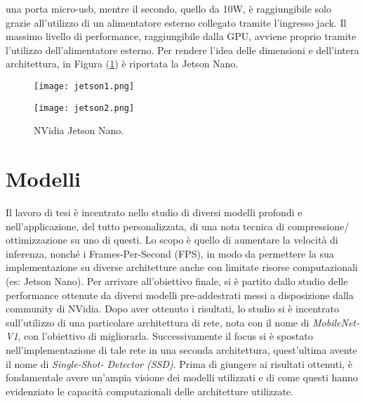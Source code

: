 una porta micro-usb, mentre il secondo, quello da 10W, è raggiungibile solo 
grazie all'utilizzo di un alimentatore esterno collegato tramite l'ingresso 
jack. Il massimo livello di performance, raggiungibile dalla GPU, avviene 
proprio tramite l'utilizzo dell'alimentatore esterno. Per rendere l'idea delle 
dimensioni e dell'intera architettura, in Figura (\ref{jetson}) è riportata la Jetson 
Nano.
\begin{figure}[]
    \begin{minipage}[t]{.45\textwidth}
        \centering
        \texttt{[image: jetson1.png]}
    \end{minipage}
    \hfill
    \begin{minipage}[t]{.45\textwidth}
        \centering
        \texttt{[image: jetson2.png]}
    \end{minipage}  
    \caption{NVidia Jetson Nano.}
    \label{jetson}
\end{figure}

\section{Modelli}
Il lavoro di tesi è incentrato nello studio di diversi modelli profondi e 
nell'applicazione, del tutto personalizzata, di una nota tecnica di compressione/
ottimizzazione su uno di questi. Lo scopo è quello di aumentare 
la velocità di inferenza, nonché i Frames-Per-Second (FPS), in modo da 
permettere la sua implementazione su diverse architetture anche con limitate 
risorse computazionali (es: Jetson Nano). Per arrivare all'obiettivo 
finale, si è partito dallo studio delle performance ottenute da diversi modelli 
pre-addestrati messi a disposizione dalla community di NVidia. Dopo aver 
ottenuto i risultati, lo studio si è incentrato sull'utilizzo di una particolare 
architettura di rete, nota con il nome di \emph{MobileNet-V1}, con l'obiettivo di migliorarla. 
Successivamente il focus si è spostato nell'implementazione di tale rete 
in una seconda architettura, quest'ultima avente il nome di \emph{Single-Shot-
Detector (SSD)}. Prima di giungere ai risultati ottenuti, è fondamentale avere 
un'ampia visione dei modelli utilizzati e di come questi hanno evidenziato 
le capacità computazionali delle architetture utilizzate. 
